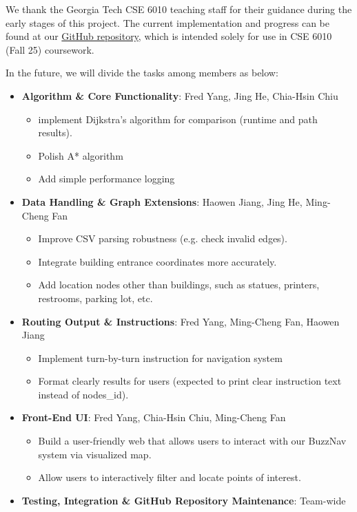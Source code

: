 \documentclass[fleqn,10pt]{olplainarticle}
\begin{document}
We thank the Georgia Tech CSE 6010 teaching staff for their guidance during the early stages of this project.  
The current implementation and progress can be found at our \href{https://github.com/fredkyang/cse6010-buzznav}{GitHub repository}, which is intended solely for use in CSE 6010 (Fall 25) coursework.

In the future, we will divide the tasks among members as below:
\begin{itemize}
    \item \textbf{Algorithm \& Core Functionality}: Fred Yang, Jing He, Chia-Hsin Chiu
        \begin{itemize}
            \item implement Dijkstra's algorithm for comparison (runtime and path results).
            \item Polish A* algorithm
            \item Add simple performance logging
        \end{itemize}
    \item \textbf{Data Handling \& Graph Extensions}: Haowen Jiang, Jing He, Ming-Cheng Fan
        \begin{itemize}
            \item Improve CSV parsing robustness (e.g. check invalid edges).
            \item Integrate building entrance coordinates more accurately.
            \item Add location nodes other than buildings, such as statues, printers, restrooms, parking lot, etc.
        \end{itemize}
    \item \textbf{Routing Output \& Instructions}: Fred Yang, Ming-Cheng Fan, Haowen Jiang
        \begin{itemize}
            \item Implement turn-by-turn instruction for navigation system
            \item Format clearly results for users (expected to print clear instruction text instead of nodes\_id).
        \end{itemize}
    \item \textbf{Front-End UI}: Fred Yang, Chia-Hsin Chiu, Ming-Cheng Fan
        \begin{itemize}
            \item Build a user-friendly web that allows users to interact with our BuzzNav system via visualized map.
            \item Allow users to interactively filter and locate points of interest.
        \end{itemize}
    \item \textbf{Testing, Integration \& GitHub Repository Maintenance}: Team-wide
\end{itemize}

%
%
\end{document}
